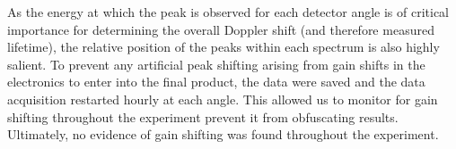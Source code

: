 As the energy at which the peak is observed for each detector angle is of critical importance for determining the overall Doppler shift (and therefore measured lifetime), the relative position of the peaks within each spectrum is also highly salient. To prevent any artificial peak shifting arising from gain shifts in the electronics to enter into the final product, the data were saved and the data acquisition restarted hourly at each angle. This allowed us to monitor for gain shifting throughout the experiment prevent it from obfuscating results. Ultimately, no evidence of gain shifting was found throughout the experiment.



%
% 
% 
